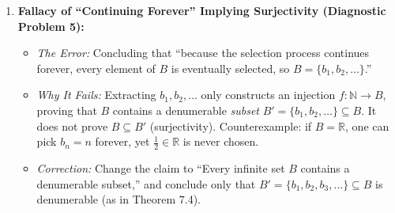 \documentclass[11pt, letterpaper]{article}
\theoremstyle{definition}
\theoremstyle{remark}
\begin{document}
\begin{enumerate}[label=\textbf{Flaw \arabic*:}]
    \item \textbf{Fallacy of ``Continuing Forever'' Implying Surjectivity (Diagnostic Problem 5):}
    \begin{itemize}
        \item \textit{The Error:} Concluding that ``because the selection process continues forever, every element of $B$ is eventually selected, so $B = \{b_1, b_2, \dots\}$.''
        \item \textit{Why It Fails:} Extracting $b_1, b_2, \dots$ only constructs an injection $f : \mathbb{N} \to B$, proving that $B$ contains a denumerable \textit{subset} $B' = \{b_1, b_2, \dots\} \subseteq B$. It does not prove $B \subseteq B'$ (surjectivity). Counterexample: if $B = \mathbb{R}$, one can pick $b_n = n$ forever, yet $\frac{1}{2} \in \mathbb{R}$ is never chosen.
        \item \textit{Correction:} Change the claim to ``Every infinite set $B$ contains a denumerable subset,'' and conclude only that $B' = \{b_1, b_2, b_3, \dots\} \subseteq B$ is denumerable (as in Theorem 7.4).
    \end{itemize}
\end{enumerate}
\end{document}
